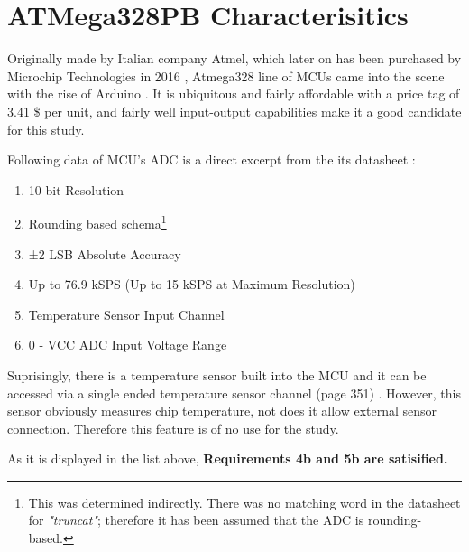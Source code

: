 \section*{ATMega328PB Characterisitics}

Originally made by Italian company Atmel, which later on has been purchased by Microchip Technologies in 2016 \cite{atmel}, Atmega328 line of MCUs came into the scene with the rise of Arduino \cite{arduino}. It is ubiquitous and fairly affordable with a price tag of 3.41 \$ per unit, and fairly well input-output capabilities make it a good candidate for this study.

Following data of MCU's ADC is a direct excerpt from the its datasheet \cite{ATMEGA328PB}:

\begin{enumerate}
    \item  10-bit Resolution
    \item  Rounding based schema\footnote{This was determined indirectly. There was no matching word in the datasheet for \textit{"truncat"}; therefore it has been assumed that the ADC is rounding-based.}
    \item  ±2 LSB Absolute Accuracy
    \item  Up to 76.9 kSPS (Up to 15 kSPS at Maximum Resolution)
    \item  Temperature Sensor Input Channel
    \item  0 - VCC ADC Input Voltage Range
\end{enumerate}

Suprisingly, there is a temperature sensor built into the MCU and it can be accessed via a single ended temperature sensor channel (page 351) \cite{ATMEGA328PB}. However, this sensor obviously measures chip temperature, not does it allow external sensor connection. Therefore this feature is of no use for the study.

As it is displayed in the list above, \textbf{Requirements 4b and 5b are satisified.}

